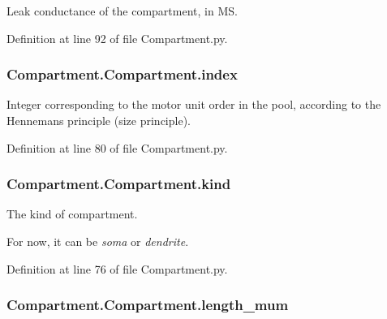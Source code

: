 Leak conductance of the compartment, in MS. 



Definition at line 92 of file Compartment.\+py.

\subsubsection[{\texorpdfstring{index}{index}}]{\setlength{\rightskip}{0pt plus 5cm}Compartment.\+Compartment.\+index}\hypertarget{class_compartment_1_1_compartment_a9402ef46ede52521ebbb9e9d2d68d631}{}\label{class_compartment_1_1_compartment_a9402ef46ede52521ebbb9e9d2d68d631}


Integer corresponding to the motor unit order in the pool, according to the Henneman\textquotesingle{}s principle (size principle). 



Definition at line 80 of file Compartment.\+py.

\subsubsection[{\texorpdfstring{kind}{kind}}]{\setlength{\rightskip}{0pt plus 5cm}Compartment.\+Compartment.\+kind}\hypertarget{class_compartment_1_1_compartment_a74f2266a2231c4a81cc680bc201f0ffd}{}\label{class_compartment_1_1_compartment_a74f2266a2231c4a81cc680bc201f0ffd}


The kind of compartment. 

For now, it can be {\itshape soma} or {\itshape dendrite}. 

Definition at line 76 of file Compartment.\+py.

\subsubsection[{\texorpdfstring{length\+\_\+mum}{length_mum}}]{\setlength{\rightskip}{0pt plus 5cm}Compartment.\+Compartment.\+length\+\_\+mum}\hypertarget{class_compartment_1_1_compartment_a8154742b0082eea301690e3566e477b6}{}\label{class_compartment_1_1_compartment_a8154742b0082eea301690e3566e477b6}


